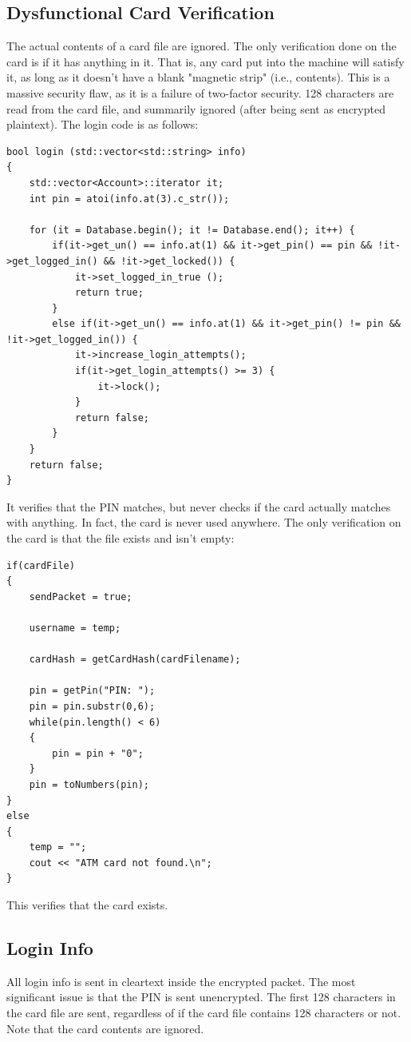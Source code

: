 \documentclass{article}
\begin{document}
\subsection{Dysfunctional Card Verification}
The actual contents of a card file are ignored. The only verification done on the card is if it has anything in it. That is, any card put into the machine will satisfy it, as long as it doesn't have a blank "magnetic strip" (i.e., contents). This is a massive security flaw, as it is a failure of two-factor security. 128 characters are read from the card file, and summarily ignored (after being sent as encrypted plaintext). The login code is as follows:
\begin{lstlisting}
bool login (std::vector<std::string> info) 
{
	std::vector<Account>::iterator it;
	int pin = atoi(info.at(3).c_str());

	for (it = Database.begin(); it != Database.end(); it++) {
		if(it->get_un() == info.at(1) && it->get_pin() == pin && !it->get_logged_in() && !it->get_locked()) {
			it->set_logged_in_true ();
			return true;
		} 
		else if(it->get_un() == info.at(1) && it->get_pin() != pin && !it->get_logged_in()) {
			it->increase_login_attempts();
			if(it->get_login_attempts() >= 3) {
				it->lock();
			}
			return false;
		}
	}
	return false;
}
\end{lstlisting}
It verifies that the PIN matches, but never checks if the card actually matches with anything. In fact, the card is never used anywhere. The only verification on the card is that the file exists and isn't empty:
\begin{lstlisting}
if(cardFile)
{
    sendPacket = true; 

    username = temp;

    cardHash = getCardHash(cardFilename);

    pin = getPin("PIN: ");
    pin = pin.substr(0,6);
    while(pin.length() < 6)
    {
        pin = pin + "0";
    }
    pin = toNumbers(pin);
}
else
{
    temp = "";
    cout << "ATM card not found.\n";
}
\end{lstlisting}
This verifies that the card exists.

\subsection{Login Info}
All login info is sent in cleartext inside the encrypted packet. The most 
significant issue is that the PIN is sent unencrypted. The first 128 characters 
in the card file are sent, regardless of if the card file contains 128 characters 
or not. Note that the card contents are ignored. 
\end{document}
